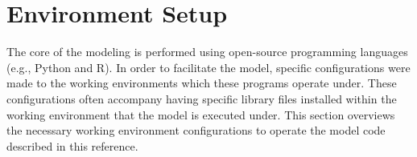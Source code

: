 %
%
%
%
%
\section{Environment Setup}
\label{sec:mes}
The core of the modeling is performed using open-source programming languages (e.g., Python and R). 
In order to facilitate the model, specific configurations were made to the working environments which these programs operate under.  
These configurations often accompany having specific library files installed within the working environment that the model is executed under.  
This section overviews the necessary working environment configurations to operate the model code described in this reference.

